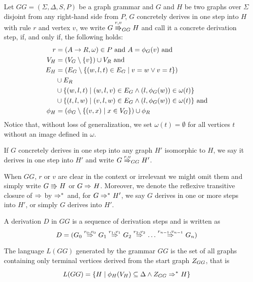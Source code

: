 \documentclass[]{report}
\begin{document}
\begin{definition}
	Let $GG = (\Sigma, \Delta, S, P)$ be a graph grammar and $G$ and $H$ be two graphs over $\Sigma$ disjoint from any right-hand side from $P$, $G$ concretely derives in one step into $H$ with rule $r$ and vertex $v$, we write $G \cderiv{r}{v}{GG} H$ and call it a concrete derivation step, if, and only if, the following holds:
	\begin{align*}
		r & = (A \to R, \omega) \in P \text{ and } A = \phi_G(v) \text{ and} \\
		V_H  & = (V_G \setminus \{v\}) \cup V_R \text{ and} \\
		E_H & = (E_G \setminus \{(w,l,t) \in E_G \; | \; v = w \lor v = t\}) \\
		& \cup E_R \\
		& \cup \{(w,l,t) \; | \; (w,l,v) \in E_G \land (l,\phi_G(w)) \in \omega(t)\} \\
		& \cup \{(t,l,w) \; | \; (v,l,w) \in E_G \land (l,\phi_G(w)) \in \omega(t)\} \text{ and} \\
		\phi_H & = (\phi_G \setminus \{(v,x) \; | \; x \in V_G \}) \cup \phi_R
	\end{align*}
	Notice that, without loss of generalization, we set $\omega(t) = \emptyset$ for all vertices $t$ without an image defined in $\omega$.
	
	If $G$ concretely derives in one step into any graph $H'$ isomorphic to $H$, we say it derives in one step into $H'$ and write $G \deriv{r}{v}{GG} H'$. 
	
	When $GG$, $r$ or $v$ are clear in the context or irrelevant we might omit them and simply write $G \cderiv{}{}{} H$ or $G \deriv{}{}{} H$. Moreover, we denote the reflexive transitive closure of $\deriv{}{}{}$ by $\derivtr{}{}{}$ and, for $G \derivtr{}{}{} H'$, we say $G$ derives in one or more steps into $H'$, or simply $G$ derives into $H'$.
\end{definition}


\begin{definition}
	A derivation $D$ in $GG$ is a sequence of derivation steps and is written as
	\[ 
		D = (G_0 \deriv{r_0}{v_0}{} G_1 \deriv{r_1}{v_1}{} G_2 \deriv{r_2}{v_2}{} \dots \deriv{r_{n-1}}{v_{n-1}}{} G_n)
	\]
\end{definition}

\begin{definition}
	The language $L(GG)$ generated by the grammar $GG$ is the set of all graphs containing only terminal vertices derived from the start graph $Z_{GG}$, that is
	\[
		L(GG) = \{H \st \phi_H(V_H) \subseteq \Delta \land \startG{GG} \derivtr{}{}{} H\}
	\]
\end{definition}
\end{document}
